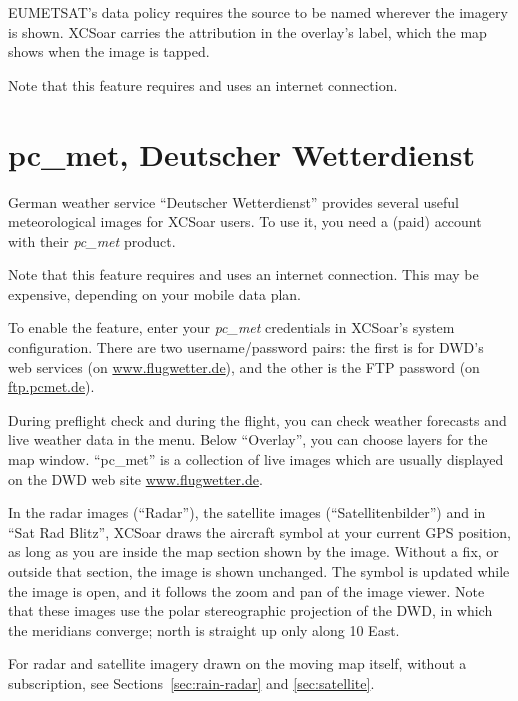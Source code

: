 EUMETSAT's data policy requires the source to be named wherever the
imagery is shown.  XCSoar carries the attribution in the overlay's
label, which the map shows when the image is tapped.

Note that this feature requires and uses an internet connection.

\section{pc\_met, Deutscher Wetterdienst}\label{sec:pcmet}

German weather service ``Deutscher Wetterdienst'' provides several
useful meteorological images for XCSoar users.  To use it, you need a
(paid) account with their \emph{pc\_met} product.

Note that this feature requires and uses an internet connection.  This
may be expensive, depending on your mobile data plan.

To enable the feature, enter your \emph{pc\_met} credentials in
XCSoar's system configuration.  There are two username/password pairs:
the first is for DWD's web services (on \url{www.flugwetter.de}),
and the other is the FTP password (on \url{ftp.pcmet.de}).

During preflight check and during the flight, you can check weather
forecasts and live weather data in the
  menu.
Below ``Overlay'', you can choose layers for the map window.
``pc\_met'' is a collection of live images which are usually displayed
on the DWD web site \url{www.flugwetter.de}.

In the radar images (``Radar''), the satellite images
(``Satellitenbilder'') and in ``Sat Rad Blitz'', XCSoar draws the
aircraft symbol at your current GPS position, as long as you are
inside the map section shown by the image.  Without a fix, or outside
that section, the image is shown unchanged.  The symbol is updated
while the image is open, and it follows the zoom and pan of the image
viewer.  Note that these images use the polar stereographic
projection of the DWD, in which the meridians converge; north is
straight up only along 10\degree{} East.

For radar and satellite imagery drawn on the moving map itself,
without a subscription, see Sections~\ref{sec:rain-radar} and
\ref{sec:satellite}.

